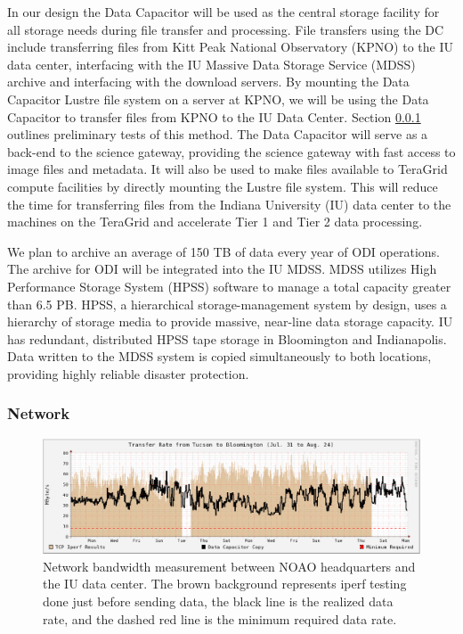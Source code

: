 \documentclass[10pt,conference]{IEEEtran}
\begin{document}
In our design the Data Capacitor will be used as the central storage facility for all storage needs during file transfer and processing. File transfers using the DC include transferring files from Kitt Peak National Observatory (KPNO) to the IU data center, interfacing with the IU Massive Data Storage Service (MDSS) \cite{mdss} archive and interfacing with the download servers. By mounting the Data Capacitor Lustre file system on a server at KPNO, we will be using the Data Capacitor to transfer files from KPNO to the IU Data Center. Section \ref{sec:network} outlines preliminary tests of this method. The Data Capacitor will serve as a back-end to the science gateway, providing the science gateway with fast access to image files and metadata. It will also be used to make files available to TeraGrid compute facilities by directly mounting the Lustre file system. This will reduce the time for transferring files from the Indiana University (IU) data center to the machines on the TeraGrid and accelerate Tier 1 and Tier 2 data processing.

We plan to archive an average of 150 TB of data every year of ODI operations. The archive for ODI will be integrated into the IU MDSS. MDSS utilizes High Performance Storage System (HPSS) software to manage a total capacity greater than 6.5 PB. HPSS, a hierarchical storage-management system by design, uses a hierarchy of storage media to provide massive, near-line data storage capacity. IU has redundant, distributed HPSS tape storage in Bloomington and Indianapolis. Data written to the MDSS system is copied simultaneously to both locations, providing highly reliable disaster protection. 

\subsubsection{Network}\label{sec:network}
\begin{figure}[t]
\centering
\includegraphics[width=6in]{network_throughput.eps}
\caption{Network bandwidth measurement between NOAO headquarters and the IU data center. The brown background represents iperf testing done just before sending data, the black line is the realized data rate, and the dashed red line is the minimum required data rate.}
\label{fig:network}
\end{figure}
\end{document}
